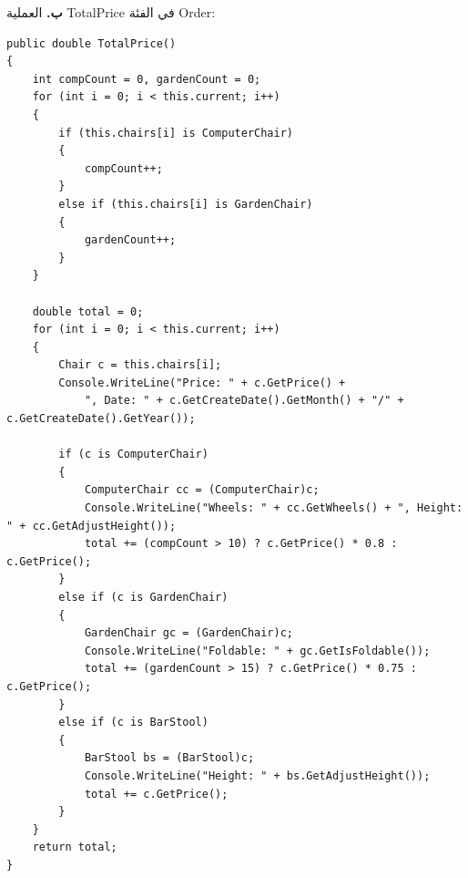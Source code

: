 \begin{boxSolution}
\textbf{ب.} العملية \textenglish{TotalPrice} في الفئة \textenglish{Order}:
\begin{boxCode}
\begin{english}
\begin{verbatim}
public double TotalPrice()
{
    int compCount = 0, gardenCount = 0;
    for (int i = 0; i < this.current; i++)
    {
        if (this.chairs[i] is ComputerChair)
        {
            compCount++;
        }
        else if (this.chairs[i] is GardenChair)
        {
            gardenCount++;
        }
    }

    double total = 0;
    for (int i = 0; i < this.current; i++)
    {
        Chair c = this.chairs[i];
        Console.WriteLine("Price: " + c.GetPrice() +
            ", Date: " + c.GetCreateDate().GetMonth() + "/" + c.GetCreateDate().GetYear());

        if (c is ComputerChair)
        {
            ComputerChair cc = (ComputerChair)c;
            Console.WriteLine("Wheels: " + cc.GetWheels() + ", Height: " + cc.GetAdjustHeight());
            total += (compCount > 10) ? c.GetPrice() * 0.8 : c.GetPrice();
        }
        else if (c is GardenChair)
        {
            GardenChair gc = (GardenChair)c;
            Console.WriteLine("Foldable: " + gc.GetIsFoldable());
            total += (gardenCount > 15) ? c.GetPrice() * 0.75 : c.GetPrice();
        }
        else if (c is BarStool)
        {
            BarStool bs = (BarStool)c;
            Console.WriteLine("Height: " + bs.GetAdjustHeight());
            total += c.GetPrice();
        }
    }
    return total;
}
\end{verbatim}
\end{english}
\end{boxCode}
\end{boxSolution}
\fi
\filbreak
